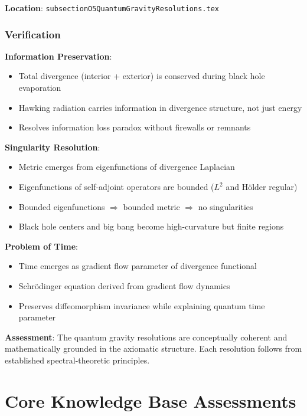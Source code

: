 \documentclass[11pt,a4paper]{article}
\theoremstyle{definition}
\begin{document}
\textbf{Location}: \texttt{subsectionO5QuantumGravityResolutions.tex}

\subsubsection{Verification}

\textbf{Information Preservation}:
\begin{itemize}
    \item Total divergence (interior + exterior) is conserved during black hole evaporation
    \item Hawking radiation carries information in divergence structure, not just energy
    \item Resolves information loss paradox without firewalls or remnants
\end{itemize}

\textbf{Singularity Resolution}:
\begin{itemize}
    \item Metric emerges from eigenfunctions of divergence Laplacian
    \item Eigenfunctions of self-adjoint operators are bounded ($L^2$ and Hölder regular)
    \item Bounded eigenfunctions $\Rightarrow$ bounded metric $\Rightarrow$ no singularities
    \item Black hole centers and big bang become high-curvature but finite regions
\end{itemize}

\textbf{Problem of Time}:
\begin{itemize}
    \item Time emerges as gradient flow parameter of divergence functional
    \item Schrödinger equation derived from gradient flow dynamics
    \item Preserves diffeomorphism invariance while explaining quantum time parameter
\end{itemize}

\textbf{Assessment}: The quantum gravity resolutions are conceptually coherent and mathematically grounded in the axiomatic structure. Each resolution follows from established spectral-theoretic principles.

\section{Core Knowledge Base Assessments}
\end{document}
